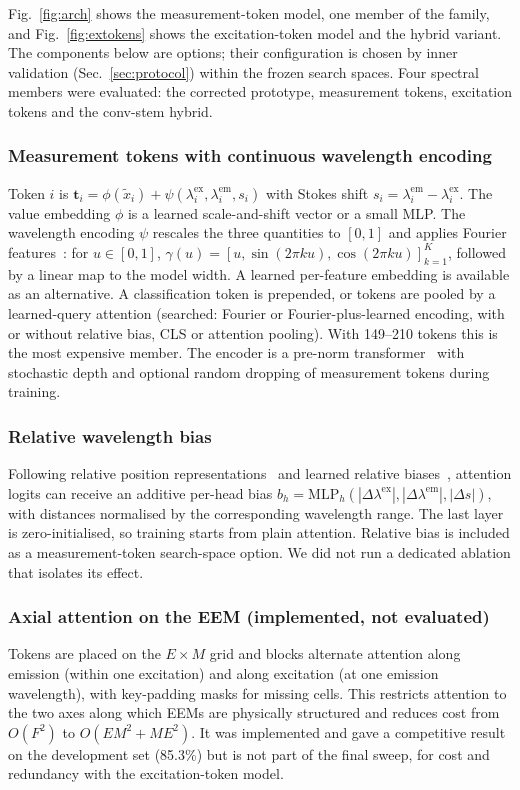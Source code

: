 \documentclass[journal]{IEEEtran}
\newcommand{\lex}{\lambda^{\mathrm{ex}}}
\newcommand{\lem}{\lambda^{\mathrm{em}}}
\begin{document}
Fig.~\ref{fig:arch} shows the measurement-token model, one member of the family, and Fig.~\ref{fig:extokens} shows the excitation-token model and the hybrid variant. The components below are options; their configuration is chosen by inner validation (Sec.~\ref{sec:protocol}) within the frozen search spaces. Four spectral members were evaluated: the corrected prototype, measurement tokens, excitation tokens and the conv-stem hybrid.

\subsubsection{Measurement tokens with continuous wavelength encoding}
Token $i$ is $\mathbf{t}_i=\phi(\tilde x_i)+\psi(\lex_i,\lem_i,s_i)$ with Stokes shift $s_i=\lem_i-\lex_i$. The value embedding $\phi$ is a learned scale-and-shift vector or a small MLP. The wavelength encoding $\psi$ rescales the three quantities to $[0,1]$ and applies Fourier features~\cite{tancik2020fourier}: for $u\in[0,1]$, $\gamma(u)=[u,\sin(2\pi k u),\cos(2\pi k u)]_{k=1}^{K}$, followed by a linear map to the model width. A learned per-feature embedding is available as an alternative. A classification token is prepended, or tokens are pooled by a learned-query attention (searched: Fourier or Fourier-plus-learned encoding, with or without relative bias, CLS or attention pooling). With 149--210 tokens this is the most expensive member. The encoder is a pre-norm transformer~\cite{vaswani2017attention} with stochastic depth and optional random dropping of measurement tokens during training.

\subsubsection{Relative wavelength bias}
Following relative position representations~\cite{shaw2018relpos} and learned relative biases~\cite{raffel2020t5}, attention logits can receive an additive per-head bias $b_h=\mathrm{MLP}_h(|\Delta\lex|,|\Delta\lem|,|\Delta s|)$, with distances normalised by the corresponding wavelength range. The last layer is zero-initialised, so training starts from plain attention. Relative bias is included as a measurement-token search-space option. We did not run a dedicated ablation that isolates its effect.

\subsubsection{Axial attention on the EEM (implemented, not evaluated)}
Tokens are placed on the $E\times M$ grid and blocks alternate attention along emission (within one excitation) and along excitation (at one emission wavelength), with key-padding masks for missing cells. This restricts attention to the two axes along which EEMs are physically structured and reduces cost from $O(F^2)$ to $O(E M^2+M E^2)$. It was implemented and gave a competitive result on the development set (85.3\%) but is not part of the final sweep, for cost and redundancy with the excitation-token model.
\end{document}
